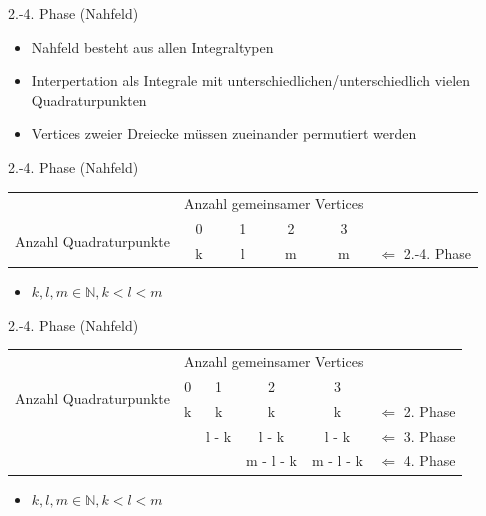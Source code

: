 \documentclass[10pt]{beamer}
\begin{document}
\begin{frame}{2.-4. Phase (Nahfeld)}
  \begin{itemize}
    \item Nahfeld besteht aus allen Integraltypen
    \item Interpertation als Integrale mit unterschiedlichen/unterschiedlich
          vielen Quadraturpunkten
    \item Vertices zweier Dreiecke müssen zueinander permutiert werden\footnotemark[1]
  \end{itemize}
  \footnotesize
  \normalsize
\end{frame}

\begin{frame}{2.-4. Phase (Nahfeld)}
  \begin{tabular}{cccccc} \cmidrule[\heavyrulewidth]{1-5}
     & \multicolumn{4}{c}{Anzahl gemeinsamer Vertices} & \\ \cmidrule{2-5}
    \multirow{2}{*}{Anzahl Quadraturpunkte} & 0 & 1 & 2 & 3 & \\ \cmidrule{2-5}
     & k & l & m & m & \(\Leftarrow\) 2.-4. Phase\\
    \cmidrule[\heavyrulewidth]{1-5}
  \end{tabular}
  \begin{itemize}
    \item \(k, l, m \in \mathbb{N}, k < l < m\)
  \end{itemize}
\end{frame}

\begin{frame}{2.-4. Phase (Nahfeld)}
  \begin{tabular}{cccccc} \cmidrule[\heavyrulewidth]{1-5}
     & \multicolumn{4}{c}{Anzahl gemeinsamer Vertices} & \\ \cmidrule{2-5}
    \multirow{2}{*}{Anzahl Quadraturpunkte} & 0 & 1 & 2 & 3 & \\ \cmidrule{2-5}
     & k & k     & k         & k         & \(\Leftarrow\) 2. Phase \\
     &   & l - k & l - k     & l - k     & \(\Leftarrow\) 3. Phase \\
     &   &       & m - l - k & m - l - k & \(\Leftarrow\) 4. Phase \\
    \cmidrule[\heavyrulewidth]{1-5}
  \end{tabular}
  \begin{itemize}
    \item \(k, l, m \in \mathbb{N}, k < l < m\)
  \end{itemize}
\end{frame}
\end{document}
